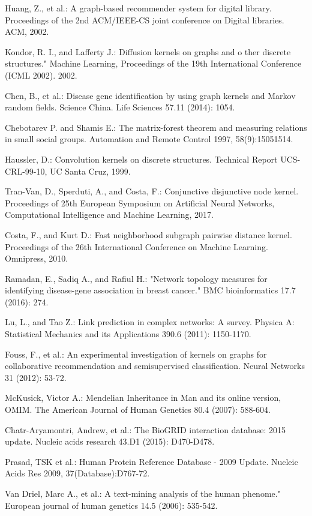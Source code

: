 \documentclass[runningheads,a4paper]{llncs}
\begin{document}
\begin{thebibliography}{4}

 Huang, Z., et al.: A graph-based recommender system for digital library. Proceedings of the 2nd ACM/IEEE-CS joint conference on Digital libraries. ACM, 2002. 

 Kondor, R. I., and Lafferty J.: Diffusion kernels on graphs and o ther discrete structures." Machine Learning, Proceedings of the 19th International Conference (ICML 2002). 2002.

 Chen, B., et al.: Disease gene identification by using graph kernels and Markov random fields. Science China. Life Sciences 57.11 (2014): 1054.

 Chebotarev P. and Shamis E.: The matrix-forest theorem and measuring relations in small social groups. Automation and Remote Control 1997, 58(9):15051514.

 Haussler, D.: Convolution kernels on discrete structures. Technical Report UCS-CRL-99-10, UC Santa Cruz, 1999.

 Tran-Van, D., Sperduti, A., and Costa, F.: Conjunctive disjunctive node kernel. Proceedings of 25th European Symposium on Artificial Neural Networks, Computational Intelligence and Machine Learning, 2017.

 Costa, F., and Kurt D.: Fast neighborhood subgraph pairwise distance kernel. Proceedings of the 26th International Conference on Machine Learning. Omnipress, 2010.

 Ramadan, E., Sadiq A., and Rafiul H.: "Network topology measures for identifying disease-gene association in breast cancer." BMC bioinformatics 17.7 (2016): 274.

 Lu, L., and Tao Z.: Link prediction in complex networks: A survey. Physica A: Statistical Mechanics and its Applications 390.6 (2011): 1150-1170.

 Fouss, F., et al.: An experimental investigation of kernels on graphs for collaborative recommendation and semisupervised classification. Neural Networks 31 (2012): 53-72.

 McKusick, Victor A.: Mendelian Inheritance in Man and its online version, OMIM. The American Journal of Human Genetics 80.4 (2007): 588-604.

 Chatr-Aryamontri, Andrew, et al.: The BioGRID interaction database: 2015 update. Nucleic acids research 43.D1 (2015): D470-D478.

 Prasad, TSK et al.: Human Protein Reference Database - 2009 Update. Nucleic Acids Res 2009, 37(Database):D767-72.

 Van Driel, Marc A., et al.: A text-mining analysis of the human phenome." European journal of human genetics 14.5 (2006): 535-542.

\end{thebibliography}
\end{document}

